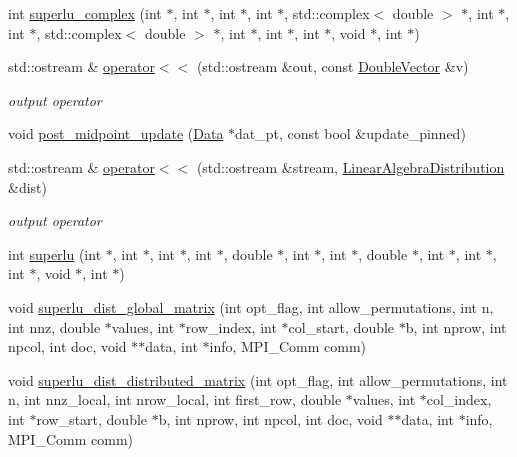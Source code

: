 \begin{DoxyCompactItemize}
int \hyperlink{namespaceoomph_a86eed4072592007720b957cf58c7bbe5}{superlu\+\_\+complex} (int $\ast$, int $\ast$, int $\ast$, int $\ast$, std\+::complex$<$ double $>$ $\ast$, int $\ast$, int $\ast$, std\+::complex$<$ double $>$ $\ast$, int $\ast$, int $\ast$, int $\ast$, void $\ast$, int $\ast$)
\item 
std\+::ostream \& \hyperlink{namespaceoomph_aa7525c5465ee2c4398c37072773f2299}{operator$<$$<$} (std\+::ostream \&out, const \hyperlink{classoomph_1_1DoubleVector}{Double\+Vector} \&v)
\begin{DoxyCompactList}\small\item\em output operator \end{DoxyCompactList}\item 
void \hyperlink{namespaceoomph_a94e38c3e339e7f204bfe1e49de1622f3}{post\+\_\+midpoint\+\_\+update} (\hyperlink{classoomph_1_1Data}{Data} $\ast$dat\+\_\+pt, const bool \&update\+\_\+pinned)
\item 
std\+::ostream \& \hyperlink{namespaceoomph_ae2dd50f979be8d64fa52baa82a5a490c}{operator$<$$<$} (std\+::ostream \&stream, \hyperlink{classoomph_1_1LinearAlgebraDistribution}{Linear\+Algebra\+Distribution} \&dist)
\begin{DoxyCompactList}\small\item\em output operator \end{DoxyCompactList}\item 
int \hyperlink{namespaceoomph_ad3cf4046d72d2de41baaa7505068d9ab}{superlu} (int $\ast$, int $\ast$, int $\ast$, int $\ast$, double $\ast$, int $\ast$, int $\ast$, double $\ast$, int $\ast$, int $\ast$, int $\ast$, void $\ast$, int $\ast$)
\item 
void \hyperlink{namespaceoomph_a69210c78770d5e7a589b23ca3b821ec1}{superlu\+\_\+dist\+\_\+global\+\_\+matrix} (int opt\+\_\+flag, int allow\+\_\+permutations, int n, int nnz, double $\ast$values, int $\ast$row\+\_\+index, int $\ast$col\+\_\+start, double $\ast$b, int nprow, int npcol, int doc, void $\ast$$\ast$data, int $\ast$info, M\+P\+I\+\_\+\+Comm comm)
\item 
void \hyperlink{namespaceoomph_afda4e6a29a247cb24203d0c93047a05e}{superlu\+\_\+dist\+\_\+distributed\+\_\+matrix} (int opt\+\_\+flag, int allow\+\_\+permutations, int n, int nnz\+\_\+local, int nrow\+\_\+local, int first\+\_\+row, double $\ast$values, int $\ast$col\+\_\+index, int $\ast$row\+\_\+start, double $\ast$b, int nprow, int npcol, int doc, void $\ast$$\ast$data, int $\ast$info, M\+P\+I\+\_\+\+Comm comm)
\item 

\end{DoxyCompactItemize}
